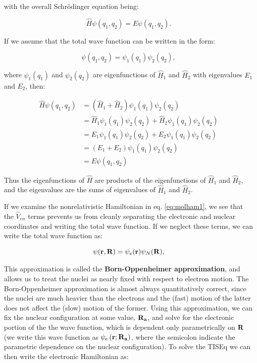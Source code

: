 \documentclass[
  9pt,
]{extbook}
\theoremstyle{definition}
\theoremstyle{definition}
\theoremstyle{definition}
\theoremstyle{remark}
\begin{document}
with the overall Schrödinger equation being:

\begin{equation}
\hat{H} \psi(q_1, q_2) = E \psi(q_1, q_2).
\label{eq:molham4}
\end{equation}

If we assume that the total wave function can be written in the form:

\begin{equation}
\psi(q_1, q_2) = \psi_1(q_1) \psi_2(q_2),
\label{eq:molham5}
\end{equation}

where \(\psi_1(q_1)\) and \(\psi_2(q_2)\) are eigenfunctions of \(\hat{H}_1\) and \(\hat{H}_2\) with eigenvalues \(E_1\) and \(E_2\), then:

\begin{equation}
\begin{aligned}
\displaystyle \hat{H} \psi(q_1, q_2) &= ( \hat{H}_1 + \hat{H}_2 ) \psi_1(q_1) \psi_2(q_2) \\
    &= \hat{H}_1 \psi_1(q_1) \psi_2(q_2) + \hat{H}_2 \psi_1(q_1) \psi_2(q_2) \\
    &= E_1 \psi_1(q_1) \psi_2(q_2) + E_2 \psi_1(q_1) \psi_2(q_2) \\
    &= (E_1 + E_2) \psi_1(q_1) \psi_2(q_2) \\
    &= E \psi(q_1, q_2)
\end{aligned}
\label{eq:molham6}
\end{equation}

Thus the eigenfunctions of \(\hat{H}\) are products of the eigenfunctions of \(\hat{H}_1\) and \(\hat{H}_2\), and the eigenvalues are the sums of eigenvalues of \(\hat{H}_1\) and \(\hat{H}_2\).

If we examine the nonrelativistic Hamiltonian in eq. \eqref{eq:molham1}, we see that the \(\hat{V}_{en}\) terms prevents us from cleanly separating the electronic and nuclear coordinates and writing the total wave function. If we neglect these terms, we can write the total wave function as:

\begin{equation}
\psi({\bf r}, {\bf R}) = \psi_e({\bf r}) \psi_N({\bf R}),
\label{eq:molham7}
\end{equation}

This approximation is called the \textbf{Born-Oppenheimer approximation}, and allows us to treat the nuclei as nearly fixed with respect to electron motion. The Born-Oppenheimer approximation is almost always quantitatively correct, since the nuclei are much heavier than the electrons and the (fast) motion of the latter does not affect the (slow) motion of the former. Using this approximation, we can fix the nuclear configuration at some value, \({\bf R_a}\), and solve for the electronic portion of the the wave function, which is dependent only parametrically on \({\bf R}\) (we write this wave function as \(\psi_e \left({\bf r}; {\bf R_a} \right)\), where the semicolon indicate the parametric dependence on the nuclear configuration). To solve the TISEq we can then write the electronic Hamiltonian as:
\end{document}
